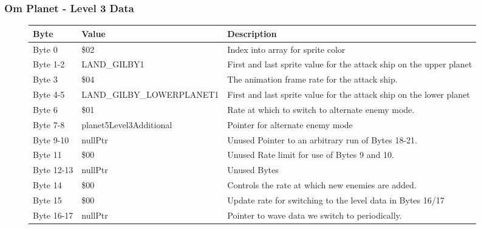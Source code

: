 \clearpage
\subsubsection{Om Planet - Level 3 Data}

\begin{figure}[H]
  {
  \setlength{\tabcolsep}{3.0pt}
  \setlength\cmidrulewidth{\heavyrulewidth} %
  \begin{adjustbox}{width=12cm}

\begin{tabular}{lll}
\toprule
 Byte       & Value                     & Description                                                         \\
\midrule
 Byte 0     & \$02                       & Index into array for sprite color                                   \\
 Byte 1-2   & LAND\_GILBY1               & First and last sprite value for the attack ship on the upper planet \\
 Byte 3     & \$04                       & The animation frame rate for the attack ship.                       \\
 Byte 4-5   & LAND\_GILBY\_LOWERPLANET1   & First and last sprite value for the attack ship on the lower planet \\
 Byte 6     & \$01                       & Rate at which to switch to alternate enemy mode.                    \\
 Byte 7-8   & planet5Level3Additional   & Pointer for alternate enemy mode                                    \\
 Byte 9-10  & nullPtr                   & Unused Pointer to an arbitrary run of Bytes 18-21.                  \\
 Byte 11    & \$00                       & Unused Rate limit for use of Bytes 9 and 10.                        \\
 Byte 12-13 & nullPtr                   & Unused Bytes                                                        \\
 Byte 14    & \$00                       & Controls the rate at which new enemies are added.                   \\
 Byte 15    & \$00                       & Update rate for switching to the level data in Bytes 16/17          \\
 Byte 16-17 & nullPtr                   & Pointer to wave data we switch to periodically.                     \\

\end{tabular}
\end{adjustbox}}
\end{figure}
